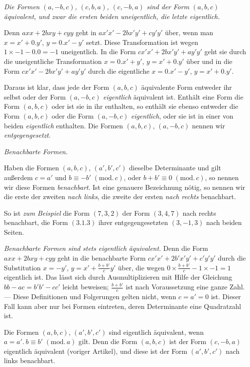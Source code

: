 \textit{Die Formen $(a,-b,c)$, $(c,b,a)$, $(c,-b,a)$ sind der Form $(a,b,c)$ äquivalent, und zwar die ersten beiden uneigentlich, die letzte eigentlich.}

Denn $axx+2bxy+cyy$ geht in $ax'x'-2bx'y'+cy'y'$ über, wenn man $x=x'+0.y'$, $y=0.x'-y'$ setzt. Diese Transformation ist wegen $1\times-1-0.0=-1$ uneigentlich. In die Form $cx'x'+2bx'y'+ay'y'$ geht sie durch die uneigentliche Transformation $x=0.x'+y'$, $y=x'+0.y'$ über und in die Form $cx'x'-2bx'y'+ay'y'$ durch die eigentliche $x=0.x'-y'$, $y=x'+0.y'$.

Daraus ist klar, dass jede der Form $(a,b,c)$ äquivalente Form entweder ihr selbst oder der Form $(a,-b,c)$ \textit{eigentlich} äquivalent ist. Enthält eine Form die Form $(a,b,c)$ oder ist sie in ihr enthalten, so enthält sie ebenso entweder die Form $(a,b,c)$ oder die Form $(a,-b,c)$ \textit{eigentlich}, oder sie ist in einer von beiden \textit{eigentlich} enthalten. Die Formen $(a,b,c)$, $(a,-b,c)$ nennen wir \textit{entgegengesetzt}.

\begin{center}
\textit{Benachbarte Formen.}
\end{center}
Haben die Formen $(a,b,c)$, $(a',b',c')$ dieselbe Determinante und gilt außerdem $c=a'$ und $b\equiv-b'\; (\mathrm{mod.}\,c)$, oder $b+b'\equiv0\; (\mathrm{mod.}\,c)$, so nennen wir diese Formen \textit{benachbart}. Ist eine genauere Bezeichnung nötig, so nennen wir die erste der zweiten \textit{nach links}, die zweite der ersten \textit{nach rechts} benachbart.

So ist \textit{zum Beispiel} die Form $(7,3,2)$ der Form $(3,4,7)$ nach rechts benachbart, die Form $(3.1.3)$ ihrer entgegengesetzten $(3,-1,3)$ nach beiden Seiten.

\textit{Benachbarte Formen sind stets eigentlich äquivalent.} Denn die Form $axx+2bxy+cyy$ geht in die benachbarte Form $cx'x'+2b'x'y'+c'y'y'$ durch die Substitution $x=-y'$, $y=x'+\frac{b+b'}{c}y'$ über, die wegen $0\times\frac{b+b'}{c}-1\times-1=1$ eigentlich ist. Das lässt sich durch Ausmultiplizieren mit Hilfe der Gleichung $bb-ac=b'b'-cc'$ leicht beweisen; $\frac{b+b'}{c}$ ist nach Voraussetzung eine ganze Zahl. --- Diese Definitionen und Folgerungen gelten nicht, wenn $c=a'=0$ ist. Dieser Fall kann aber nur bei Formen eintreten, deren Determinante eine Quadratzahl ist.

Die Formen $(a,b,c)$, $(a',b',c')$ sind eigentlich äquivalent, wenn $a=a'.\ b\equiv b'\; (\mathrm{mod.}\,a)$ gilt. Denn die Form $(a,b,c)$ ist der Form $(c,-b,a)$ eigentlich äquivalent (voriger Artikel), und diese ist der Form $(a',b',c')$ nach links benachbart.

